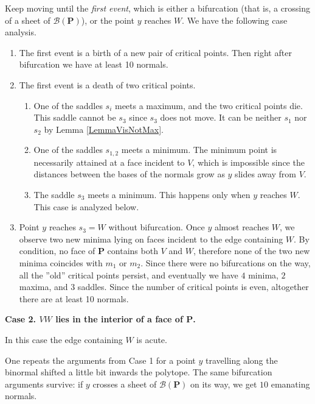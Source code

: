 \documentclass[12pt]{amsart}
\newtheorem*{main lemma}{The main lemma}
\begin{document}
Keep moving until the  \textit{first  event},  which is either a bifurcation (that is, a crossing of a sheet of $\mathcal{B}(\mathbf{P})$),  or   the point $y$ reaches $W$. We have the following case analysis. \begin{enumerate}

\item The first event is a birth of a new pair of critical points. Then right after bifurcation we have at least 10 normals.

\item The first event is a death of two critical points.
\begin{enumerate}
  \item One of the saddles  $s_i$ meets a maximum, and the two critical points die. This saddle cannot be $s_3$ since $s_3$ does not move. It can be neither $s_1$ nor $s_2$ by Lemma \ref{LemmaVisNotMax}.
\item One of the saddles $s_{1,2}$ meets a minimum. The minimum point is necessarily attained at a face incident to $V$, which is impossible since the distances between the bases of the normals grow as $y$ slides away from $V$.
\item The saddle $s_{3}$ meets a minimum. This happens only when $y$ reaches $W$. This case is analyzed below.
 
\end{enumerate}

\item Point $y$ reaches  $s_3 = W$ without bifurcation. Once $y$ almost reaches $W$, we observe two new minima lying on faces incident to the edge containing  $W$. By condition, no face of $\mathbf{P}$ contains both $V$ and $W$, therefore none of the two  new minima coincides with $m_1$ or $m_2$. Since there were no bifurcations on the way, all the ''old'' critical points persist, and eventually we have $4$ minima, $2$ maxima, and  $3$ saddles. Since the number of critical points is even,    altogether there are  at least 10 normals.
                                           \end{enumerate}

\medskip

\textbf{Case 2.  $VW$ lies in the interior of a face of $\mathbf{P}$.}

In this case the edge containing $W$ is acute.  


One repeats the arguments from Case 1 for a point $y$ travelling along the binormal shifted a little bit inwards the polytope.
The same bifurcation arguments survive: if $y$ crosses a sheet of $\mathcal{B}(\mathbf{P})$ on its way, we get $10$ emanating normals.
\end{document}
